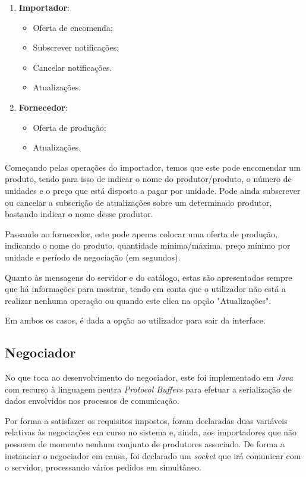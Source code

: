 \documentclass[a4paper]{report}
\begin{document}
	\begin{enumerate}
		\item \textbf{Importador}:
		\begin{itemize}
			\item Oferta de encomenda;
			\item Subscrever notificações;
			\item Cancelar notificações.
			\item Atualizações.
		\end{itemize}

		\item \textbf{Fornecedor}:
		\begin{itemize}
			\item Oferta de produção;
			\item Atualizações.
		\end{itemize}
	\end{enumerate}

	Começando pelas operações do importador, temos que este pode encomendar um produto, tendo para isso de indicar o nome do produtor/produto, o número de unidades e o preço que está disposto a pagar por unidade. Pode ainda subscrever ou cancelar a subscrição de atualizações sobre um determinado produtor, bastando indicar o nome desse produtor.
	
	Passando ao fornecedor, este pode apenas colocar uma oferta de produção, indicando o nome do produto, quantidade mínima/máxima, preço mínimo por unidade e período de negociação (em segundos).
	
	Quanto às mensagens do servidor e do catálogo, estas são apresentadas sempre que há informações para mostrar, tendo em conta que o utilizador não está a realizar nenhuma operação ou quando este clica na opção "Atualizações".
	
	Em ambos os casos, é dada a opção ao utilizador para sair da interface.

	\subsection{Negociador}
	No que toca ao desenvolvimento do negociador, este foi implementado em \textit{Java} com recurso à linguagem neutra \textit{Protocol Buffers} para efetuar a serialização de dados envolvidos nos processos de comunicação. 
	
	Por forma a satisfazer os requisitos impostos, foram declaradas duas variáveis relativas às negociações em curso no sistema e, ainda, aos importadores que não possuem de momento nenhum conjunto de produtores associado. 
	De forma a instanciar o negociador em causa, foi declarado um \textit{socket} que irá comunicar com o servidor, processando vários pedidos em simultâneo.
	
\end{document}
